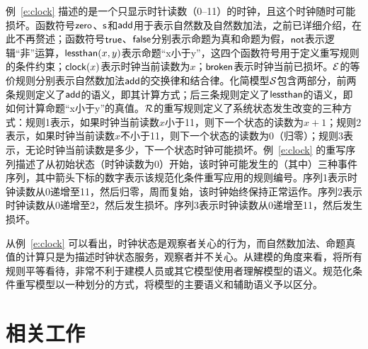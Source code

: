 例~\ref{e:clock} 描述的是一个只显示时针读数（0--11）的时钟，且这个时钟随时可能损坏。函数符号$\operatorname{\mathsf{zero}}$、$\operatorname{\mathsf{s}}$和$\operatorname{\mathsf{add}}$用于表示自然数及自然数加法，之前已详细介绍，在此不再赘述；函数符号$\operatorname{\mathsf{true}}$、$\operatorname{\mathsf{false}}$分别表示命题为真和命题为假，$\operatorname{\mathsf{not}}$表示逻辑“非”运算，$\operatorname{\mathsf{lessthan}}(x,y)$表示命题“x小于y”，这四个函数符号用于定义重写规则的条件约束；$\operatorname{\mathsf{clock}}(x)$表示时钟当前读数为$x$；$\operatorname{\mathsf{broken}}$表示时钟当前已损坏。$\mathcal{E}$的等价规则分别表示自然数加法$\operatorname{\mathsf{add}}$的交换律和结合律。化简模型$\mathcal{S}$包含两部分，前两条规则定义了$\operatorname{\mathsf{add}}$的语义，即其计算方式；后三条规则定义了$\operatorname{\mathsf{lessthan}}$的语义，即如何计算命题“x小于y”的真值。$\mathcal{R}$的重写规则定义了系统状态发生改变的三种方式：规则1表示，如果时钟当前读数$x$小于11，则下一个状态的读数为$x+1$；规则2表示，如果时钟当前读数$x$不小于11，则下一个状态的读数为0（归零）；规则3表示，无论时钟当前读数是多少，下一个状态时钟可能损坏。例~\ref{e:clock} 的重写序列描述了从初始状态（时钟读数为0）开始，该时钟可能发生的（其中）三种事件序列，其中箭头下标的数字表示该规范化条件重写应用的规则编号。序列1表示时钟读数从0递增至11，然后归零，周而复始，该时钟始终保持正常运作。序列2表示时钟读数从0递增至2，然后发生损坏。序列3表示时钟读数从0递增至11，然后发生损坏。

从例~\ref{e:clock} 可以看出，时钟状态是观察者关心的行为，而自然数加法、命题真值的计算只是为描述时钟状态服务，观察者并不关心。从建模的角度来看，将所有规则平等看待，非常不利于建模人员或其它模型使用者理解模型的语义。规范化条件重写模型以一种划分的方式，将模型的主要语义和辅助语义予以区分。

\section{相关工作}


